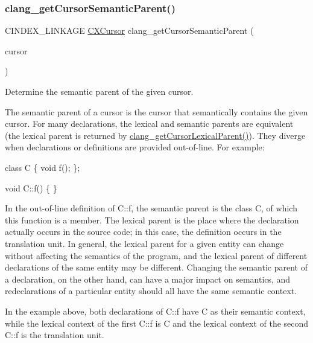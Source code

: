 \subsubsection{\texorpdfstring{clang\+\_\+get\+Cursor\+Semantic\+Parent()}{clang\_getCursorSemanticParent()}}
{\footnotesize\ttfamily C\+I\+N\+D\+E\+X\+\_\+\+L\+I\+N\+K\+A\+GE \mbox{\hyperlink{structCXCursor}{C\+X\+Cursor}} clang\+\_\+get\+Cursor\+Semantic\+Parent (\begin{DoxyParamCaption}\item[{\mbox{\hyperlink{structCXCursor}{C\+X\+Cursor}}}]{cursor }\end{DoxyParamCaption})}



Determine the semantic parent of the given cursor. 

The semantic parent of a cursor is the cursor that semantically contains the given {\ttfamily cursor}. For many declarations, the lexical and semantic parents are equivalent (the lexical parent is returned by {\ttfamily \mbox{\hyperlink{group__CINDEX__CURSOR__MANIP_gace7a423874d72b3fdc71d6b0f31830dd}{clang\+\_\+get\+Cursor\+Lexical\+Parent()}}}). They diverge when declarations or definitions are provided out-\/of-\/line. For example\+:


\begin{DoxyCode}
\textcolor{keyword}{class }C \{
 \textcolor{keywordtype}{void} f();
\};

\textcolor{keywordtype}{void} C::f() \{ \}
\end{DoxyCode}


In the out-\/of-\/line definition of {\ttfamily C\+::f}, the semantic parent is the class {\ttfamily C}, of which this function is a member. The lexical parent is the place where the declaration actually occurs in the source code; in this case, the definition occurs in the translation unit. In general, the lexical parent for a given entity can change without affecting the semantics of the program, and the lexical parent of different declarations of the same entity may be different. Changing the semantic parent of a declaration, on the other hand, can have a major impact on semantics, and redeclarations of a particular entity should all have the same semantic context.

In the example above, both declarations of {\ttfamily C\+::f} have {\ttfamily C} as their semantic context, while the lexical context of the first {\ttfamily C\+::f} is {\ttfamily C} and the lexical context of the second {\ttfamily C\+::f} is the translation unit.

